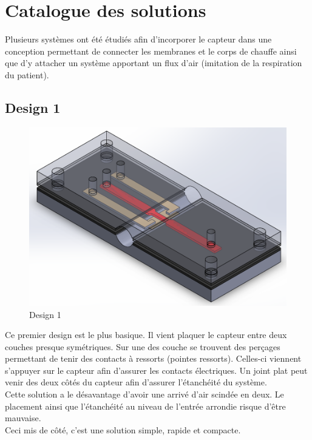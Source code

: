 \section{Catalogue des solutions}
Plusieurs systèmes ont été étudiés afin d'incorporer le capteur dans une conception permettant de connecter les membranes et le corps de chauffe
ainsi que d'y attacher un système apportant un flux d'air (imitation de la respiration du patient).

\subsection{Design 1}
\begin{figure}[H]
    \centering
    \includegraphics[scale = 0.3]{images/Design1.png}
    \caption{Design 1}
    \label{fig:design1}
\end{figure}
Ce premier design est le plus basique. Il vient plaquer le capteur entre deux couches presque symétriques. Sur une des couche se trouvent des
perçages permettant de tenir des contacts à ressorts (pointes ressorts). Celles-ci viennent s'appuyer sur le capteur afin d'assurer les contacts
électriques. Un joint plat peut venir des deux côtés du capteur afin d'assurer l'étanchéité du système.\\
Cette solution a le désavantage d'avoir une arrivé d'air scindée en deux. Le placement ainsi que l'étanchéité au niveau de l'entrée
arrondie risque d'être mauvaise. \\
Ceci mis de côté, c'est une solution simple, rapide et compacte.

